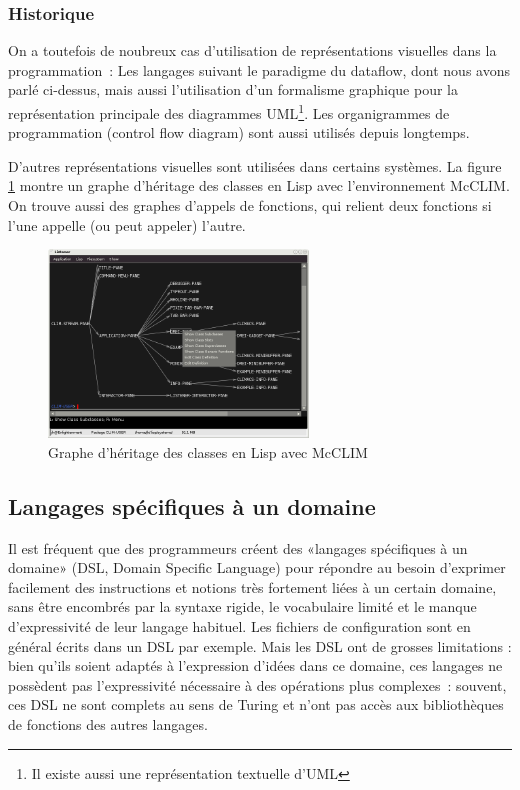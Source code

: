 \documentclass{article}
\begin{document}
\subsubsection{Historique}
On a toutefois de noubreux cas d'utilisation de représentations visuelles dans la programmation~: Les langages suivant le paradigme du
dataflow, dont nous avons parlé ci-dessus, mais aussi l'utilisation d'un formalisme graphique pour la représentation principale des
diagrammes UML\footnote{Il existe aussi une représentation textuelle d'UML\cite{htun-spec}}. Les organigrammes de programmation (control
flow diagram) sont aussi utilisés depuis longtemps.

D'autres représentations visuelles sont utilisées dans certains systèmes. La figure \ref{fig:lisp-class-graph} montre un graphe d'héritage
des classes en Lisp avec l'environnement McCLIM. On trouve aussi des graphes d'appels de fonctions\cite{lisp-func-graph}, qui relient deux fonctions si l'une
appelle (ou peut appeler) l'autre.

\begin{figure}[h!]
  \centering
  \includegraphics[height=5cm]{lisp-class-graph}
  \caption{Graphe d'héritage des classes en Lisp avec McCLIM\cite{lisp-class-graph}}
\label{fig:lisp-class-graph}
\end{figure}

\subsection{Langages spécifiques à un domaine}
\label{sec:dsl}

Il est fréquent que des programmeurs créent des «langages spécifiques à un domaine» (DSL, Domain Specific Language) pour répondre au besoin
d'exprimer facilement des instructions et notions très fortement liées à un certain domaine, sans être encombrés par la syntaxe rigide, le
vocabulaire limité et le manque d'expressivité de leur langage habituel. Les fichiers de configuration sont en général écrits dans un DSL
par exemple. Mais les DSL ont de grosses limitations : bien qu'ils soient adaptés à l'expression d'idées dans ce domaine, ces langages ne
possèdent pas l'expressivité nécessaire à des opérations plus complexes~: souvent, ces DSL ne sont complets au sens de Turing et n'ont pas
accès aux bibliothèques de fonctions des autres langages.
\end{document}
